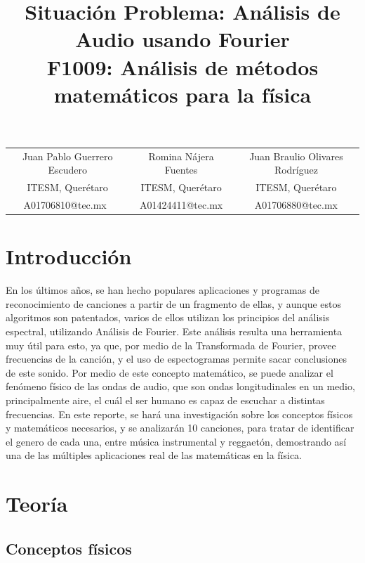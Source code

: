 \documentclass[12pt, letterpaper]{article}
\title{%
  Situación Problema: Análisis de Audio usando Fourier \\
  \large F1009: Análisis de métodos matemáticos para la física}
\author{}
\begin{document}
\maketitle

\begin{tabular}{ccc}
Juan Pablo Guerrero Escudero & Romina Nájera Fuentes & Juan Braulio Olivares Rodríguez\\
ITESM, Querétaro & ITESM, Querétaro & ITESM, Querétaro\\
A01706810@tec.mx & A01424411@tec.mx & A01706880@tec.mx
\end{tabular}


\section{Introducción}
En los últimos años, se han hecho populares aplicaciones y programas de reconocimiento de 
canciones a partir de un fragmento de ellas, y aunque estos algoritmos son patentados, varios de ellos
utilizan los principios del análisis espectral, utilizando Análisis de Fourier. Este análisis
resulta una herramienta muy útil para esto, ya que, por medio de la Transformada de Fourier, provee frecuencias de 
la canción, y el uso de espectogramas permite sacar conclusiones de este sonido. Por medio de 
este concepto matemático, se puede analizar el fenómeno físico de las ondas de audio, que son ondas longitudinales 
en un medio, principalmente aire, el cuál el ser humano es capaz de escuchar a distintas frecuencias. En este reporte, se 
hará una investigación sobre los conceptos físicos y matemáticos necesarios, y se analizarán 10 canciones, para 
tratar de identificar el genero de cada una, entre música instrumental y reggaetón, demostrando así una de las múltiples aplicaciones real de las matemáticas en la física.
\section{Teoría}

\subsection{Conceptos físicos}
\end{document}
